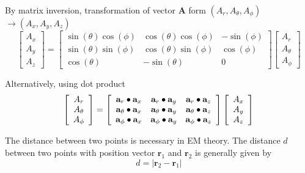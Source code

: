 \documentclass{article}
\begin{document}
By matrix inversion, transformation of vector $\mathbf{A}$ form $\left(
A_{r},A_{\theta },A_{\phi }\right) $ $\longrightarrow \left(
A_{x},A_{y},A_{z}\right) $ 
\[
\left[ 
\begin{array}{c}
A_{x} \\ 
A_{y} \\ 
A_{z}%
\end{array}%
\right] =\left[ 
\begin{array}{ccc}
\sin \left( \theta \right) \cos \left( \phi \right) & \cos \left( \theta
\right) \cos \left( \phi \right) & -\sin \left( \phi \right) \\ 
\sin \left( \theta \right) \sin \left( \phi \right) & \cos \left( \theta
\right) \sin \left( \phi \right) & \cos \left( \phi \right) \\ 
\cos \left( \theta \right) & -\sin \left( \theta \right) & 0%
\end{array}%
\right] \left[ 
\begin{array}{c}
A_{r} \\ 
A_{\theta } \\ 
A_{\phi }%
\end{array}%
\right] 
\]

Alternatively, using dot product 
\[
\left[ 
\begin{array}{c}
A_{r} \\ 
A_{\theta } \\ 
A_{\phi }%
\end{array}%
\right] =\left[ 
\begin{array}{ccc}
\mathbf{a}_{r}\bullet \mathbf{a}_{x} & \mathbf{a}_{r}\bullet \mathbf{a}_{y}
& \mathbf{a}_{r}\bullet \mathbf{a}_{z} \\ 
\mathbf{a}_{\theta }\bullet \mathbf{a}_{x} & \mathbf{a}_{\theta }\bullet 
\mathbf{a}_{y} & \mathbf{a}_{\theta }\bullet \mathbf{a}_{z} \\ 
\mathbf{a}_{\phi }\bullet \mathbf{a}_{x} & \mathbf{a}_{\phi }\bullet \mathbf{%
a}_{y} & \mathbf{a}_{\phi }\bullet \mathbf{a}_{z}%
\end{array}%
\right] \left[ 
\begin{array}{c}
A_{x} \\ 
A_{y} \\ 
A_{z}%
\end{array}%
\right] 
\]

The distance between two points is necessary in EM theory. The distance $d$
between two points with position vector $\mathbf{r}_{1}$ and $\mathbf{r}_{2}$
is generally given by 
\[
d=\left\vert \mathbf{r}_{2}-\mathbf{r}_{1}\right\vert 
\]
\end{document}
